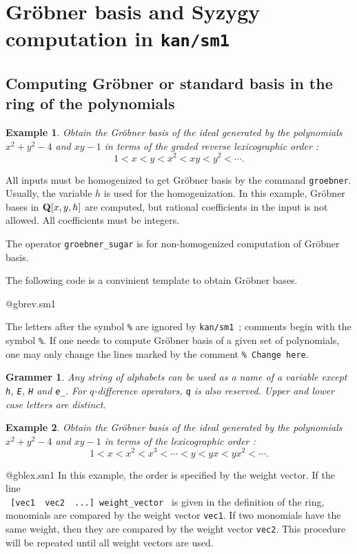 \documentclass{article}
\def\kansm{ {\tt kan/sm1}\ }
\newtheorem{example}{Example}
\newtheorem{grammer}{Grammer}
\begin{document}
\section{Gr\"obner basis and Syzygy computation in \kansm}
\subsection{Computing Gr\"obner or standard basis in the ring of the polynomials}

\begin{example}
Obtain the Gr\"obner basis of the ideal generated by 
the polynomials $x^2+y^2-4$ and $xy-1$ in terms of the graded reverse
lexicographic order :
$$ 1 < x < y < x^2 < xy < y^2 < \cdots. $$
\end{example}
 
All inputs must be homogenized to get Gr\"obner basis
by the command {\tt groebner}. 
Usually, the variable $h$ is used for the homogenization.
In this example,
Gr\"obner bases in 
${\bf Q}[x,y,h]$ are computed, 
but rational coefficients in the input is not allowed.
All coefficients must be integers.

The operator {\tt groebner\_sugar} is for non-homogenized
computation of Gr\"obner basis.

The following code is a convinient template to obtain
Gr\"obner bases.

@gbrev.sm1

The letters after the symbol {\tt \%} are ignored by \kansm ;
comments begin with the symbol {\tt \%}.
If one needs to compute Gr\"obner basis of a given set of polynomials,
one may only change the lines marked by the comment
{\tt \% Change here}.

\begin{grammer}
Any string of alphabets can be used as a name of a variable except
{\tt h}, {\tt E}, {\tt H} and {\tt e\_}.
For $q$-difference operators, {\tt q} is also reserved.
Upper and lower case letters are distinct.
\end{grammer}

\bigbreak

\begin{example}
Obtain the Gr\"obner basis of the ideal generated by 
the polynomials $x^2+y^2-4$ and $xy-1$ in terms of the 
lexicographic order :
$$ 1 < x < x^2 < x^3 < \cdots < y < yx < yx^2 < \cdots. $$
\end{example}


@gblex.sm1
In this example, the order is specified by the weight vector.
If the line \\
\verb+ [vec1  vec2  ...] weight_vector +
is given in the definition of the ring,
monomials are compared by the weight vector {\tt vec1}.
If two monomials have the same weight, then they are
compared by the weight vector {\tt vec2}.
This procedure will be repeated until all weight vectors are used.
\end{document}
